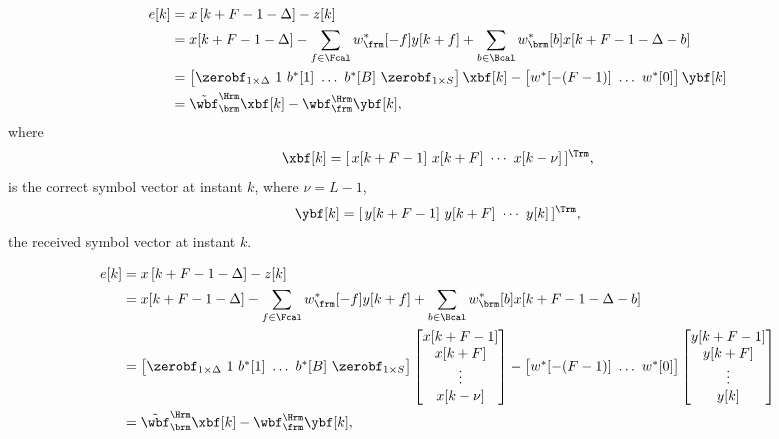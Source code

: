 
\begin{align}
e[k] &= x\left[k+F-1-\Delta\right] -z[k] \nonumber \\ 
& = x[k + F - 1- \Delta] - \sum_{f \in \Fcal} w_{\frm}^{*}[-f]y[k+f] + \sum_{b \in \Bcal} w_{\brm}^{*}
[b]x[k+F-1-\Delta-b] \nonumber \\ 
& = \begin{bmatrix} \zerobf_{1 \times \Delta} ~ 1 ~ b^{*}[1] ~ \dots ~ b^{*}[B] ~ \zerobf_{1 \times S}  \end{bmatrix} \xbf[k] - \begin{bmatrix} w^{*}[-(F-1)] ~\dots~ w^{*}[0] \end{bmatrix}\ybf[k] \label{eq:SfirstTime}\\
&= \tilde{\wbf}_{\brm}^{\Hrm}\xbf[k] - \wbf_{\frm}^{\Hrm}\ybf[k], \label{eq:ek}
\end{align}
where
\begin{equation}
\xbf[k] = [ \, x[k+F-1] ~ x[k+F] ~ \cdots ~ x[k-\nu] \,]^{\Trm},
\end{equation}
is the correct symbol vector at instant $k$, where $\nu = L - 1$,
\begin{equation}
\ybf[k]= [ \, y[k+F-1] ~ y[k+F] ~ \cdots ~ y[k] \,]^{\Trm},
\end{equation}  
the received symbol vector at instant $k$.




\begin{align}
e[k] &= x\left[k+F-1-\Delta\right] -z[k] \nonumber \\ 
& = x[k + F - 1- \Delta] - \sum_{f \in \Fcal} w_{\frm}^{*}[-f]y[k+f] + \sum_{b \in \Bcal} w_{\brm}^{*}
[b]x[k+F-1-\Delta-b] \nonumber \\ 
& = \begin{bmatrix} \zerobf_{1 \times \Delta} ~ 1 ~ b^{*}[1] ~ \dots ~ b^{*}[B] ~ \zerobf_{1 \times S}  \end{bmatrix} \begin{bmatrix} x[k+F-1] \\ x[k+F] \\ \vdots \\ x[k-\nu] \end{bmatrix} - \begin{bmatrix} w^{*}[-(F-1)] ~\dots~ w^{*}[0] \end{bmatrix} \begin{bmatrix}  y[k+F-1] \\ y[k+F] \\ \vdots \\ y[k] \end{bmatrix} \label{eq:SfirstTime}\\
&= \tilde{\wbf}_{\brm}^{\Hrm}\xbf[k] - \wbf_{\frm}^{\Hrm}\ybf[k], \label{eq:ek}
\end{align}




